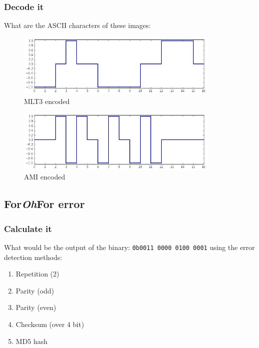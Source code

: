 \documentclass[11pt]{article}
\begin{document}
\subsubsection{Decode it}
What are the ASCII characters of these images:
  \begin{figure}[h]
    \centering
    \includegraphics[height=3cm]{../slides/imgs/MLT3:).jpg}
    \caption{MLT3 encoded}
    \label{fig:mlt3}
  \end{figure}
  \begin{figure}[h]
    \centering
    \includegraphics[height=3cm]{../slides/imgs/AMI;p.jpg}
    \caption{AMI encoded}
    \label{fig:ami}
  \end{figure}

\subsection{For\emph{Oh}For error}
\subsubsection{Calculate it}
What would be the output of the binary: \verb$0b0011 0000 0100 0001$ using the error detection methods:
  \begin{enumerate}
    \item Repetition (2)         %
    \item Parity (odd)           %
    \item Parity (even)          %
    \item Checksum (over 4 bit)  %
    \item MD5 hash               %
  \end{enumerate}
\end{document}
